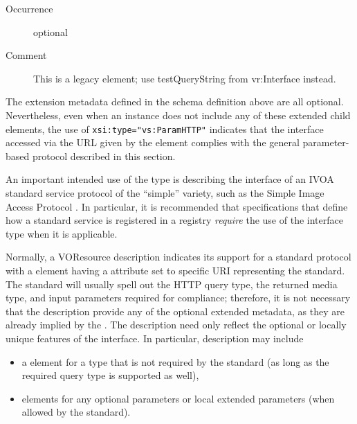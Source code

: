 \documentclass[11pt,a4paper]{ivoa}
\begin{document}
\begin{generated}
\begin{bigdescription}
\begin{description}
\item[Occurrence] optional
\item[Comment]
                       This is a legacy element; use testQueryString from
                       vr:Interface instead.


\end{description}


\end{bigdescription}\endgroup

\endgroup
\end{generated}


The extension metadata defined in the schema definition above are all
optional.  Nevertheless, even when an 
instance does not include any of these extended child elements, the
use of \verb|xsi:type="vs:ParamHTTP"| indicates that the interface
accessed via the URL given by the 
element complies with the general parameter-based protocol described
in this section.







An important intended use of the  type is
describing the interface of an IVOA standard service protocol
of the ``simple'' variety, such as the Simple Image Access Protocol
\citep{2015ivoa.spec.1223D}.  In particular, it is recommended that
specifications that define how a standard service is registered in a
registry \emph{require} the use of the 
interface type when it is applicable.



Normally, a VOResource
description indicates its support for a standard protocol with a
 element having a
 attribute set to specific URI representing the
standard.  The standard will usually spell out the HTTP query type,
the returned media type, and input parameters required for compliance;
therefore, it is not necessary that the 
description provide any of the optional extended metadata, as they are
already implied by the .  The description need
only reflect the optional or locally unique features of the
interface.  In particular, description may include


\begin{itemize}
\item a  element for a type that is not
  required by the standard (as long as the required query type is
  supported as well),

\item {}\/ elements for any optional parameters
       or local extended parameters (when allowed by the standard).
\end{itemize}
\end{document}
